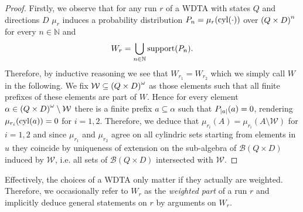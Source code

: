 \begin{proof}
  Firstly, we observe that for any run $r$ of a \ac{WDTA} with states $Q$ and
  directions $D$ $\mu_{r}$ induces a probability distribution 
  $P_{n} = \mu_{r}(\operatorname{cyl}(\cdot))$ over $\left(Q\times D\right)^{n}$ for every 
  $n\in\mathbb{N}$ and
  \begin{equation*}
    W_{r} = \bigcup_{n\in\mathbb{N}}\operatorname{support}(P_{n}).
  \end{equation*}
  Therefore, by inductive reasoning we see that $W_{r_{1}} = W_{r_{2}}$ which
  we simply call $W$ in the following. We fix
  $\mathcal{W}\subseteq\left(Q\times D\right)^{\omega}$ as those elements such that
  all finite prefixes of these elements are part of $W$. Hence for every 
  element $\alpha\in \left(Q\times D\right)^{\omega}\setminus\mathcal{W}$ there is
  a finite prefix $a\subseteq\alpha$ such that $P_{\left\vert{a}\right\vert}(a) = 0$, rendering
  $\mu_{r_{i}}(\operatorname{cyl}(a)) = 0$ for $i = 1,2$. Therefore, we deduce that
  $\mu_{r_{i}}(A) = \mu_{r_{i}}(A\setminus\mathcal{W})$ for $i = 1,2$ and since
  $\mu_{r_{1}}$ and $\mu_{r_{2}}$ agree on all cylindric sets starting from 
  elements in $u$ they coincide by uniqueness of extension on the sub-algebra
  of $\mathcal{B}(Q\times D)$ induced by $\mathcal{W}$, i.e. all sets of 
  $\mathcal{B}(Q\times D)$ intersected with $\mathcal{W}$.
\end{proof}
Effectively, the choices of a \ac{WDTA} only matter if they actually are 
weighted. Therefore, we occasionally refer to $W_{r}$ as the 
\emph{weighted part} of a run $r$ and implicitly deduce general statements on
$r$ by arguments on $W_{r}$.

